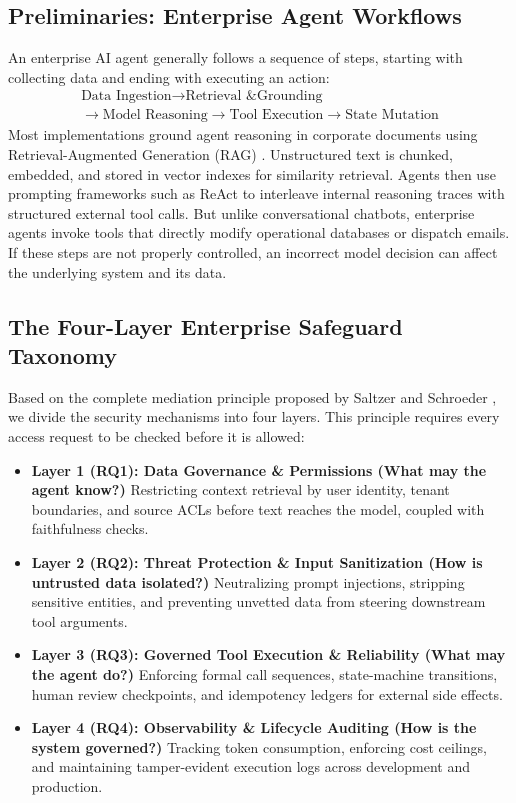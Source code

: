 \documentclass[sigconf]{acmart}
\begin{document}
\subsection{Preliminaries: Enterprise Agent Workflows}
An enterprise AI agent generally follows a sequence of steps, starting with collecting data and ending with executing an action:
\[
\begin{gathered}
\text{Data Ingestion} \longrightarrow \text{Retrieval \& Grounding} \\
\longrightarrow \text{Model Reasoning} \longrightarrow \text{Tool Execution} \longrightarrow \text{State Mutation}
\end{gathered}
\]
Most implementations ground agent reasoning in corporate documents using Retrieval-Augmented Generation (RAG) \cite{gao2023ragsurvey}. Unstructured text is chunked, embedded, and stored in vector indexes for similarity retrieval. Agents then use prompting frameworks such as ReAct \cite{yao2023react} to interleave internal reasoning traces with structured external tool calls. But unlike conversational chatbots, enterprise agents invoke tools that directly modify operational databases or dispatch emails. If these steps are not properly controlled, an incorrect model decision can affect the underlying system and its data.

\subsection{The Four-Layer Enterprise Safeguard Taxonomy}
Based on the complete mediation principle proposed by Saltzer and Schroeder \cite{saltzer1975protection}, we divide the security mechanisms into four layers. This principle requires every access request to be checked before it is allowed:
\begin{itemize}
  \item \textbf{Layer 1 (RQ1): Data Governance \& Permissions (What may the agent know?)} Restricting context retrieval by user identity, tenant boundaries, and source ACLs before text reaches the model, coupled with faithfulness checks.
  \item \textbf{Layer 2 (RQ2): Threat Protection \& Input Sanitization (How is untrusted data isolated?)} Neutralizing prompt injections, stripping sensitive entities, and preventing unvetted data from steering downstream tool arguments.
  \item \textbf{Layer 3 (RQ3): Governed Tool Execution \& Reliability (What may the agent do?)} Enforcing formal call sequences, state-machine transitions, human review checkpoints, and idempotency ledgers for external side effects.
  \item \textbf{Layer 4 (RQ4): Observability \& Lifecycle Auditing (How is the system governed?)} Tracking token consumption, enforcing cost ceilings, and maintaining tamper-evident execution logs across development and production.
\end{itemize}
\end{document}

